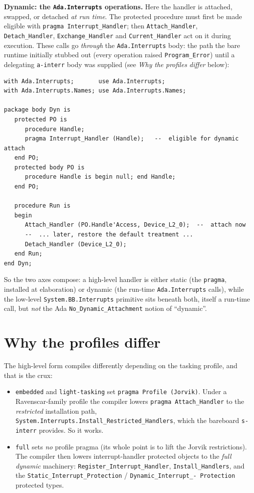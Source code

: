 \textbf{Dynamic: the \texttt{Ada.Interrupts} operations.} Here the handler is
attached, swapped, or detached \emph{at run time}. The protected procedure must
first be made eligible with \texttt{pragma Interrupt\_Handler}; then
\texttt{Attach\_Handler}, \texttt{Detach\_Handler}, \texttt{Exchange\_Handler} and
\texttt{Current\_Handler} act on it during execution. These calls go \emph{through}
the \texttt{Ada.Interrupts} body: the path the bare runtime initially stubbed
out (every operation raised \texttt{Program\_Error}) until a delegating
\texttt{a-interr} body was supplied (see \emph{Why the profiles differ} below):

\begin{lstlisting}
with Ada.Interrupts;       use Ada.Interrupts;
with Ada.Interrupts.Names; use Ada.Interrupts.Names;

package body Dyn is
   protected PO is
      procedure Handle;
      pragma Interrupt_Handler (Handle);   --  eligible for dynamic attach
   end PO;
   protected body PO is
      procedure Handle is begin null; end Handle;
   end PO;

   procedure Run is
   begin
      Attach_Handler (PO.Handle'Access, Device_L2_0);  --  attach now
      --  ... later, restore the default treatment ...
      Detach_Handler (Device_L2_0);
   end Run;
end Dyn;
\end{lstlisting}

So the two axes compose: a high-level handler is either static (the \texttt{pragma},
installed at elaboration) or dynamic (the run-time \texttt{Ada.Interrupts} calls),
while the low-level \texttt{System.BB.Interrupts} primitive sits beneath both,
itself a run-time call, but \emph{not} the Ada \texttt{No\_Dynamic\_Attachment}
notion of ``dynamic''.

\section{Why the profiles differ}

The high-level form compiles differently depending on the tasking profile, and
that is the crux:

\begin{itemize}
  \item \texttt{embedded} and \texttt{light-tasking} set \texttt{pragma Profile
        (Jorvik)}. Under a Ravenscar-family profile the compiler lowers
        \texttt{pragma Attach\_Handler} to the \emph{restricted} installation path,
        \texttt{System.Interrupts.Install\_Restricted\_Handlers}, which the
        bareboard \texttt{s-interr} provides. So it works.
  \item \texttt{full} sets \emph{no} profile pragma (its whole point is to lift
        the Jorvik restrictions). The compiler then lowers interrupt-handler
        protected objects to the \emph{full dynamic} machinery:
        \texttt{Register\_Interrupt\_Handler}, \texttt{Install\_Handlers}, and the
        \texttt{Static\_Interrupt\_Protection} / \texttt{Dynamic\_Interrupt\_-
        Protection} protected types.
\end{itemize}

